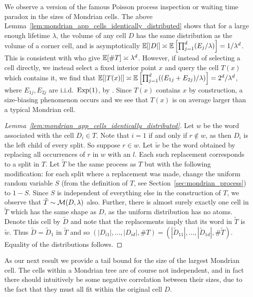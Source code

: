 We observe a version of the famous Poisson process inspection or waiting time
paradox in the sizes of Mondrian cells. The above
Lemma~\ref{lem:mondrian_app_cells_identically_distributed} shows that for a
large enough
lifetime $\lambda$, the volume of any cell $D$ has the same distribution as the
volume of a corner cell, and is asymptotically
$\mathbb{E}[|D|] \asymp \mathbb{E} \left[ \prod_{j=1}^{d} (E_j / \lambda) \right]
= 1/\lambda^d$.
This is consistent with \citet[Proposition~2]{mourtada2020minimax} who give
$\mathbb{E}[\# T] \asymp \lambda^d$.
However, if instead of selecting a cell directly,
we instead select a fixed interior point $x$
and query the cell $T(x)$ which contains it, we find that
$\mathbb{E}[|T(x)|] \asymp \mathbb{E} \left[
\prod_{j=1}^{d} ((E_{1j} + E_{2j}) / \lambda) \right]
= 2^d/\lambda^d$, where $E_{1j}, E_{2j}$ are i.i.d.\ $\operatorname{Exp}(1)$,
by \citet[Proposition~1]{mourtada2020minimax}.
Since $T(x)$ contains $x$ by construction, a size-biasing phenomenon occurs
and we see that $T(x)$ is on average larger than a typical Mondrian cell.

\begin{proof}[Lemma~\ref{lem:mondrian_app_cells_identically_distributed}]

  Let $w$ be the word associated with the cell $D_i \in T$.
  Note that $i=1$ if and only if $r \notin w$, as then $D_i$ is the left child
  of every split.
  So suppose $r \in w$.
  Let $\tilde w$ be the word obtained by replacing all occurrences
  of $r$ in $w$ with an $l$.
  Each such replacement corresponds to a split in $T$.
  Let $\tilde T$ be the same process as $T$ but with the following
  modification: for each split where a replacement was made,
  change the uniform random variable $S$
  (from the definition of $T$, see Section~\ref{sec:mondrian_process}) to $1-S$.
  Since $S$ is independent of everything else in the construction of $T$,
  we observe that $\tilde T \sim \mathcal{M}(D, \lambda)$ also.
  Further, there is almost surely exactly one cell in $\tilde T$
  which has the same shape as $D$, as the uniform distribution has no atoms.
  Denote this cell by $\tilde D$ and note that
  the replacements imply that its word in $\tilde T$
  is $\tilde w$.
  Thus $\tilde D = \tilde D_1$ in $\tilde T$ and so
  $(|D_{i1}|, \ldots, |D_{i d}|, \# T)
  = (|\tilde D_{11}|, \ldots, |\tilde D_{1d}|, \# \tilde T)$.
  Equality of the distributions follows.
\end{proof}

As our next result we provide a tail bound for the size of the largest
Mondrian cell. The cells within a Mondrian tree are of course not independent,
and in fact there should intuitively be some negative correlation between their
sizes, due to the fact that they must all fit within the original cell $D$.

